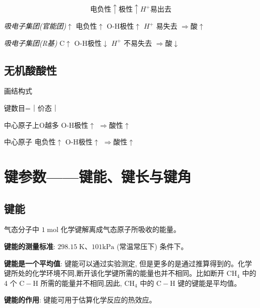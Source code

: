 \documentclass[10pt,cn]{elegantbook}
\begin{document}
$$\text{电负性}\uparrow \text{极性}\uparrow  H^{+}\text{易出去}$$

\textit{吸电子集团(官能团)}$\uparrow$ 电负性$\uparrow$  O-H极性$\uparrow$  $H^{+}$ 易失去 $\Rightarrow$酸$\uparrow$ 

\textit{吸电子集团(R基)} C$\uparrow$ O-H极性$\downarrow$  $H^{+}$ 不易失去 $\Rightarrow$酸$\downarrow$ 
\subsection{无机酸酸性}

画结构式

键数目=｜价态｜

中心原子上\ce{=}O越多  O-H极性$\uparrow$   $\Rightarrow$酸性$\uparrow$ 

中心原子 电负性$\uparrow$  O-H极性$\uparrow$  $\Rightarrow$酸性$\uparrow$ 

\section{键参数——键能、键长与键角}

\subsection{键能 }


气态分子中 \(1\mathrm{\;{mol}}\) 化学键解离成气态原子所吸收的能量。

\textbf{键能的测量标准}: \({298.15}\mathrm{\;K}\text{、}{101}\mathrm{{kPa}}\) (常温常压下) 条件下。

\textbf{键能是一个平均值}: 键能可以通过实验测定, 但是更多的是通过推算得到的。化学键所处的化学环境不同,断开该化学键所需的能量也并不相同。比如断开 \({\mathrm{{CH}}}_{4}\) 中的 4 个 \(\mathrm{C} - \mathrm{H}\) 所需的能量并不相同,因此, \({\mathrm{{CH}}}_{4}\) 中的 \(\mathrm{C} - \mathrm{H}\) 键的键能是平均值。

\textbf{键能的作用}: 键能可用于估算化学反应的热效应。
\end{document}

